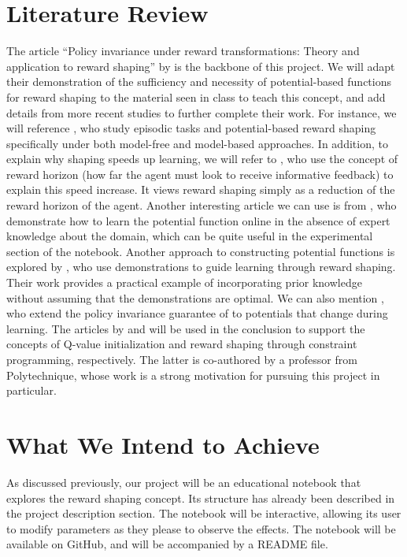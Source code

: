 \documentclass{article}
\begin{document}
\section*{Literature Review}

The article ``Policy invariance under reward transformations: Theory and application to reward shaping'' by \citet{ng1999} is the backbone of this project. We will adapt their demonstration of the sufficiency and necessity of potential-based functions for reward shaping to the material seen in class to teach this concept, and add details from more recent studies to further complete their work. For instance, we will reference \citet{grzes2017}, who study episodic tasks and potential-based reward shaping specifically under both model-free and model-based approaches. In addition, to explain why shaping speeds up learning, we will refer to \citet{laud2003}, who use the concept of reward horizon (how far the agent must look to receive informative feedback) to explain this speed increase. It views reward shaping simply as a reduction of the reward horizon of the agent. Another interesting article we can use is from \citet{grzes2010}, who demonstrate how to learn the potential function online in the absence of expert knowledge about the domain, which can be quite useful in the experimental section of the notebook. Another approach to constructing potential functions is explored by \citet{brys2015}, who use demonstrations to guide learning through reward shaping. Their work provides a practical example of incorporating prior knowledge without assuming that the demonstrations are optimal. We can also mention \citet{devlin2012}, who extend the policy invariance guarantee of \citet{ng1999} to potentials that change during learning. The articles by \citet{wiewiora2003} and \citet{yin2025} will be used in the conclusion to support the concepts of Q-value initialization and reward shaping through constraint programming, respectively. The latter is co-authored by a professor from Polytechnique, whose work is a strong motivation for pursuing this project in particular.

\section*{What We Intend to Achieve}

As discussed previously, our project will be an educational notebook that explores the reward shaping concept. Its structure has already been described in the project description section. The notebook will be interactive, allowing its user to modify parameters as they please to observe the effects. The notebook will be available on GitHub, and will be accompanied by a README file.



\end{document}
